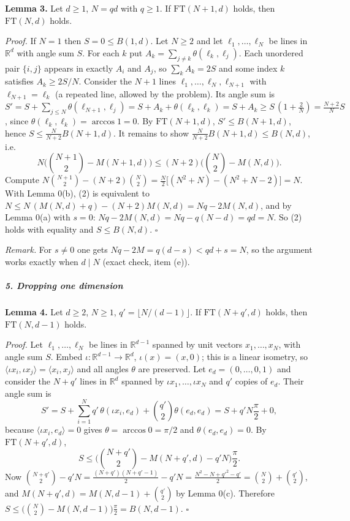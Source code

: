 \documentclass[11pt,a4paper]{article}
\begin{document}
\textbf{Lemma 3.} Let \(d\ge1\), \(N=qd\) with \(q\ge1\). If
\(\mathrm{FT}(N+1,d)\) holds, then \(\mathrm{FT}(N,d)\) holds.

\emph{Proof.} If \(N=1\) then \(S=0\le B(1,d)\). Let \(N\ge2\) and let
\(\ell_1,\dots,\ell_N\) be lines in \(\mathbb R^d\) with angle sum
\(S\). For each \(k\) put \(A_k=\sum_{j\ne k}\theta(\ell_k,\ell_j)\).
Each unordered pair \(\{i,j\}\) appears in exactly \(A_i\) and \(A_j\),
so \(\sum_kA_k=2S\) and some index \(k\) satisfies \(A_k\ge2S/N\).
Consider the \(N+1\) lines \(\ell_1,\dots,\ell_N,\ell_{N+1}\) with
\(\ell_{N+1}=\ell_k\) (a repeated line, allowed by the problem). Its
angle sum is
\(S'=S+\sum_{j\le N}\theta(\ell_{N+1},\ell_j)=S+A_k+\theta(\ell_k,\ell_k)=S+A_k\ge S\,(1+\tfrac2N)=\tfrac{N+2}{N}S\),
since \(\theta(\ell_k,\ell_k)=\arccos1=0\). By \(\mathrm{FT}(N+1,d)\),
\(S'\le B(N+1,d)\), hence \(S\le\frac{N}{N+2}B(N+1,d)\). It remains to
show \(\frac N{N+2}B(N+1,d)\le B(N,d)\), i.e.
\[N\Big(\binom{N+1}2-M(N+1,d)\Big)\le(N+2)\Big(\binom N2-M(N,d)\Big).\tag{2}\]
Compute
\(N\binom{N+1}2-(N+2)\binom N2=\frac{N}{2}\big[(N^2+N)-(N^2+N-2)\big]=N\).
With Lemma 0(b), (2) is equivalent to
\(N\le N\,(M(N,d)+q)-(N+2)M(N,d)=Nq-2M(N,d)\), and by Lemma 0(a) with
\(s=0\): \(Nq-2M(N,d)=Nq-q(N-d)=qd=N\). So (2) holds with equality and
\(S\le B(N,d)\). \(\square\)

\emph{Remark.} For \(s\ne0\) one gets \(Nq-2M=q(d-s)<qd+s=N\), so the
argument works exactly when \(d\mid N\) (exact check, item (e)).

\subparagraph{5. Dropping one dimension}\label{dropping-one-dimension}

\textbf{Lemma 4.} Let \(d\ge2\), \(N\ge1\),
\(q'=\lfloor N/(d-1)\rfloor\). If \(\mathrm{FT}(N+q',d)\) holds, then
\(\mathrm{FT}(N,d-1)\) holds.

\emph{Proof.} Let \(\ell_1,\dots,\ell_N\) be lines in
\(\mathbb R^{d-1}\) spanned by unit vectors \(x_1,\dots,x_N\), with
angle sum \(S\). Embed \(\iota:\mathbb R^{d-1}\to\mathbb R^d\),
\(\iota(x)=(x,0)\); this is a linear isometry, so
\(\langle\iota x_i,\iota x_j\rangle=\langle x_i,x_j\rangle\) and all
angles \(\theta\) are preserved. Let \(e_d=(0,\dots,0,1)\) and consider
the \(N+q'\) lines in \(\mathbb R^d\) spanned by
\(\iota x_1,\dots,\iota x_N\) and \(q'\) copies of \(e_d\). Their angle
sum is
\[S'=S+\sum_{i=1}^{N}q'\,\theta(\iota x_i,e_d)+\binom{q'}2\theta(e_d,e_d)=S+q'N\frac\pi2+0,\]
because \(\langle\iota x_i,e_d\rangle=0\) gives
\(\theta=\arccos0=\pi/2\) and \(\theta(e_d,e_d)=0\). By
\(\mathrm{FT}(N+q',d)\),
\[S\le\Big(\binom{N+q'}2-M(N+q',d)-q'N\Big)\frac\pi2.\] Now
\(\binom{N+q'}2-q'N=\frac{(N+q')(N+q'-1)}2-q'N=\frac{N^2-N+q'^2-q'}2=\binom N2+\binom{q'}2\),
and \(M(N+q',d)=M(N,d-1)+\binom{q'}2\) by Lemma 0(c). Therefore
\(S\le\big(\binom N2-M(N,d-1)\big)\frac\pi2=B(N,d-1)\). \(\square\)
\end{document}
